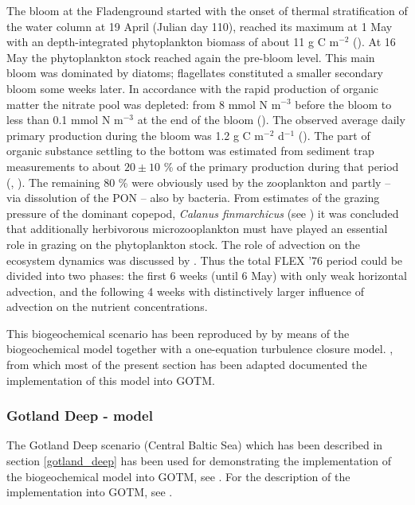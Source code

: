 The bloom at the Fladenground started with the onset of thermal 
stratification of the water
column at 19 April (Julian day 110), reached its maximum at 1 May
with an depth-integrated phytoplankton biomass of about 11 g C m$^{-2}$
(\cite{Radachetal1980}). At 16 May the phytoplankton stock reached again the
pre-bloom level. This main bloom was dominated by diatoms;
flagellates constituted a smaller secondary bloom some weeks later.
In accordance with the rapid production of organic matter the
nitrate pool was depleted: from 8 mmol N m$^{-3}$ before the bloom to
less than 0.1 mmol N m$^{-3}$ at the end of the bloom
(\cite{Brockmannetal1983}).
The observed average daily primary production during the bloom was
1.2 g C m$^{-2}$ d$^{-1}$ (\cite{Weigeletal1980}).
The part of organic substance settling to the bottom was estimated
from sediment trap measurements to about $20 \pm 10$ \%
of the primary production during that period
(\cite{Daviesetal1984}, \cite{Radachetal1984}). The remaining 80 \% were
obviously used by the zooplankton and partly --
via dissolution of the PON -- also by bacteria. From estimates
of the grazing pressure of the dominant copepod, {\it Calanus finmarchicus}
(see \cite{Krauseetal1980}) it was concluded that additionally herbivorous
microzooplankton must have played an essential role in grazing
on the phytoplankton stock.
The role of advection on the ecosystem dynamics was discussed
by \cite{Eberleinetal1980}. Thus the total FLEX '76 period could be
divided into two phases: the first 6 weeks (until 6 May) with
only weak horizontal advection, and the following 4 weeks with distinctively
larger influence of advection on the nutrient concentrations.

This biogeochemical scenario has been reproduced by \cite{KuehnRadach1997}
by means of the \cite{Fashametal1990} biogeochemical
model together with a
one-equation turbulence closure model. \cite{Burchardetal05},
from which most of the present section has been adapted
documented the implementation of this model into GOTM.

\subsubsection{Gotland Deep - \cite{Neumannetal2002} model}\label{gotland_iow}

The Gotland Deep scenario (Central Baltic Sea) which has been described 
in section \ref{gotland_deep} has been used for 
demonstrating the implementation of the \cite{Neumannetal2002}
biogeochemical model into GOTM, see \cite{Burchardetal05}.
For the description of the implementation into GOTM,
see \cite{Burchardetal05}. 

